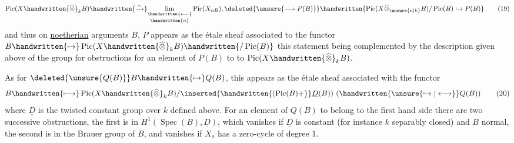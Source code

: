 \[
\operatorname{Pic}(X\handwritten{\widehat{\otimes}}_k B)\handwritten{\xrightarrow{\sim}}\underset{\handwritten{n}}{\underset{\handwritten{\longleftarrow}}{\lim}}\operatorname{Pic}(X_{nB}),\deleted{\unsure{\longrightarrow P(B)}}\handwritten{\operatorname{Pic}(X\widehat{\otimes}_{\unsure{n|k}}B)/\operatorname{Pic}(B)\hookrightarrow P(B)}
\tag*{(19)}
\]
and thus on \uline{noetherian} arguments $B$, $P$ appears as the étale sheaf associated to the functor $B\handwritten{\mapsto}\operatorname{Pic}(X\handwritten{\widehat{\otimes}}_k B)\handwritten{/\operatorname{Pic}(B)}$  this statement being complemented by the description given above of the group for obstructions for an element of $P(B)$ to  to $\operatorname{Pic}(X\handwritten{\widehat{\otimes}}_k B)$.

As for $\deleted{\unsure{Q(B)}}B\handwritten{\mapsto}Q(B)$, this appears as the  étale sheaf associated with the functor
\[
B\handwritten{\longmapsto}\operatorname{Pic}(X\handwritten{\widehat{\otimes}}_k B)/\inserted{\handwritten{(\operatorname{Pic}(B)+}}\underline{D}(B))\ (\handwritten{\unsure{\hookrightarrow|\longleftrightarrow}}Q(B))
\tag*{(20)}
\]
where $\underline{D}$ is the twisted constant group over $k$ defined above. For an element of $Q(B)$ to belong to the first hand side there are two successive obstructions, the first is in $H^1(\operatorname{Spec}(B),\underline{D})$, which vanishes  if $\underline{D}$ is constant (for instance $k$ separably closed) and $B$ normal, the second is in the Brauer group of $B$, and vanishes  if $X_o$ has a zero-cycle of degree $1$.

